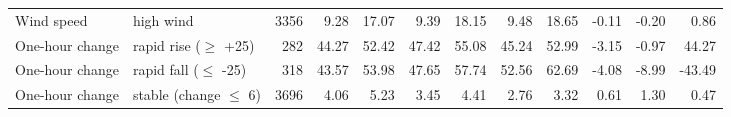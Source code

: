 \begin{table}[t]
\begin{tabular}{llrrrrrrrrrr}
Wind speed & high wind & 3356 & 9.28 & 17.07 & 9.39 & 18.15 & 9.48 & 18.65 & -0.11 & -0.20 & 0.86 \\
One-hour change & rapid rise ($\geq$ +25) & 282 & 44.27 & 52.42 & 47.42 & 55.08 & 45.24 & 52.99 & -3.15 & -0.97 & 44.27 \\
One-hour change & rapid fall ($\leq$ -25) & 318 & 43.57 & 53.98 & 47.65 & 57.74 & 52.56 & 62.69 & -4.08 & -8.99 & -43.49 \\
One-hour change & stable (\textbar{}change\textbar{} $\leq$ 6) & 3696 & 4.06 & 5.23 & 3.45 & 4.41 & 2.76 & 3.32 & 0.61 & 1.30 & 0.47 \\
\bottomrule
\end{tabular}
\end{table}
